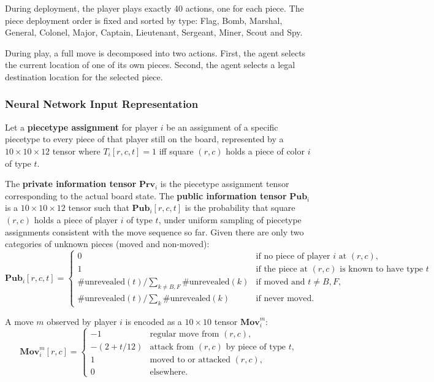 During deployment, the player plays exactly 40 actions, one for each piece. The piece deployment order is fixed and sorted by type: Flag, Bomb, Marshal, General, Colonel, Major, Captain, Lieutenant, Sergeant, Miner, Scout and Spy.

During play, a full move is decomposed into two actions. First, the agent selects the current location of one of its own pieces. Second, the agent selects a legal destination location for the selected piece.

\subsubsection{Neural Network Input Representation}
Let a \textbf{piecetype assignment} for player $i$ be an assignment of a specific piecetype to every piece of that player still on the board, represented by a $10 \times 10 \times 12$ tensor where $T_i[r, c, t] = 1$ iff square $(r, c)$ holds a piece of color $i$ of type $t$.

The \textbf{private information tensor} $\textbf{Prv}_i$ is the piecetype assignment tensor corresponding to the actual board state. The \textbf{public information tensor} $\textbf{Pub}_i$ is a $10 \times 10 \times 12$ tensor such that $\textbf{Pub}_i[r, c, t]$ is the probability that square $(r,c)$ holds a piece of player $i$ of type $t$, under uniform sampling of piecetype assignments consistent with the move sequence so far. Given there are only two categories of unknown pieces (moved and non-moved):
$$\textbf{Pub}_i[r, c, t] = \begin{cases}
0 & \text{if no piece of player $i$ at $(r,c)$}, \\
1 & \text{if the piece at $(r,c)$ is known to have type $t$}, \\
\#\text{unrevealed}(t) / \sum_{k \ne B,F} \#\text{unrevealed}(k) & \text{if moved and $t \ne B,F$}, \\
\#\text{unrevealed}(t) / \sum_{k} \#\text{unrevealed}(k) & \text{if never moved}.
\end{cases}$$

A move $m$ observed by player $i$ is encoded as a $10 \times 10$ tensor $\textbf{Mov}_i^m$:
$$\textbf{Mov}_i^m[r, c] = \begin{cases}
-1 & \text{regular move from $(r,c)$}, \\
-(2 + t/12) & \text{attack from $(r,c)$ by piece of type $t$}, \\
1 & \text{moved to or attacked $(r,c)$}, \\
0 & \text{elsewhere}.
\end{cases}$$

